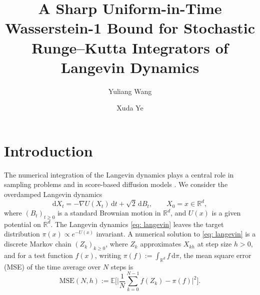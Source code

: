 \documentclass[namedate,webpdf,imanum]{ima-authoring-template}
\newcommand{\Ge}{\geqslant}
\newcommand{\D}{\mathrm{d}}
\theoremstyle{thmstyletwo}
\newcommand{\yw}[1]{\todo[inline,color=blue!35]{YW: #1}}
\numberwithin{equation}{section}
\begin{document}

\title[A Sharp Wasserstein-1 Bound for Stochastic Runge--Kutta Integrators]{A Sharp Uniform-in-Time Wasserstein-1 Bound for Stochastic Runge--Kutta Integrators of Langevin Dynamics}

\author{Yuliang Wang
\address{, , }}

\author{Xuda Ye
\address{, , }}



\maketitle

\section{Introduction}
\label{sec: intro}

The numerical integration of the Langevin dynamics plays a central role in sampling problems \citep{lelievre2016partial} and in score-based diffusion models \citep{song2021score}. We consider the overdamped Langevin dynamics
\begin{equation}
    \D X_t = -\nabla U(X_t)\,\D t + \sqrt2\,\D B_t , \qquad X_0 = x \in \mathbb R^d ,
    \label{eq: langevin}
\end{equation}
where $(B_t)_{t \Ge 0}$ is a standard Brownian motion in $\mathbb R^d$, and $U(x)$ is a given potential on $\mathbb R^d$. The Langevin dynamics \eqref{eq: langevin} leaves the target distribution $\pi(x) \propto e^{-U(x)}$ invariant. A numerical solution to \eqref{eq: langevin} is a discrete Markov chain $(Z_k)_{k \Ge 0}$, where $Z_k$ approximates $X_{kh}$ at step size $h > 0$, and for a test function $f(x)$, writing $\pi(f) := \int_{\mathbb R^d} f \,\D\pi$, the mean square error (MSE) of the time average over $N$ steps is
\begin{equation}
    \mathrm{MSE}(N, h) := \mathbb E \Biggl[ \biggl| \frac1N \sum_{k=0}^{N-1} f(Z_k) - \pi(f) \biggr|^2 \Biggr] .
    \label{eq: mse}
\end{equation}
\end{document}
